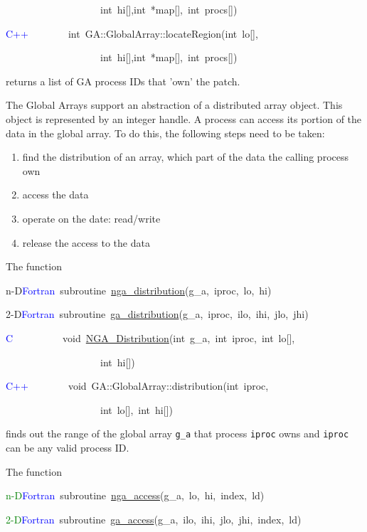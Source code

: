 ~~~~~~~~~~~~~~~~~~~int~hi{[}{]},int~{*}map{[}{]},~int~procs{[}{]})~

\textcolor{blue}{C++}~~~~~~~~int~GA::GlobalArray::locateRegion(int~lo{[}{]},~

~~~~~~~~~~~~~~~~~~~int~hi{[}{]},int~{*}map{[}{]},~int~procs{[}{]})

returns a list of GA process IDs that 'own' the patch.

The Global Arrays support an abstraction of a distributed array object.
This object is represented by an integer handle. A process can access
its portion of the data in the global array. To do this, the following
steps need to be taken:
\begin{enumerate}
\item find the distribution of an array, which part of the data the calling
process own 
\item access the data 
\item operate on the date: read/write 
\item release the access to the data
\end{enumerate}
The function

n-D\textcolor{blue}{Fortran}~subroutine~\href{https://hpc.pnl.gov/globalarrays/api/f_op_api.html\#ga_distribute}{nga\_{}distribution}(g\_a,~iproc,~lo,~hi)~

2-D\textcolor{blue}{Fortran}~subroutine~\href{https://hpc.pnl.gov/globalarrays/api/f_op_api.html\#ga_distribute}{ga\_{}distribution}(g\_a,~iproc,~ilo,~ihi,~jlo,~jhi)

\textcolor{blue}{C}~~~~~~~~~~void~\href{https://hpc.pnl.gov/globalarrays/api/c_op_api.html\#ga_distribute}{NGA\_{}Distribution}(int~g\_a,~int~iproc,~int~lo{[}{]},~

~~~~~~~~~~~~~~~~~~~int~hi{[}{]})

\textcolor{blue}{C++}~~~~~~~~void~GA::GlobalArray::distribution(int~iproc,~

~~~~~~~~~~~~~~~~~~~int~lo{[}{]},~int~hi{[}{]})

finds out the range of the global array \texttt{g\_a} that process
\texttt{iproc} owns and \texttt{iproc} can be any valid process ID.

The function

\textcolor{green}{n-D}\textcolor{blue}{Fortran}~subroutine~\href{https://hpc.pnl.gov/globalarrays/api/f_op_api.html\#ga_access}{nga\_{}access}(g\_a,~lo,~hi,~index,~ld)~

\textcolor{green}{2-D}\textcolor{blue}{Fortran}~subroutine~\href{https://hpc.pnl.gov/globalarrays/api/f_op_api.html\#ga_access}{ga\_{}access}(g\_a,~ilo,~ihi,~jlo,~jhi,~index,~ld)

